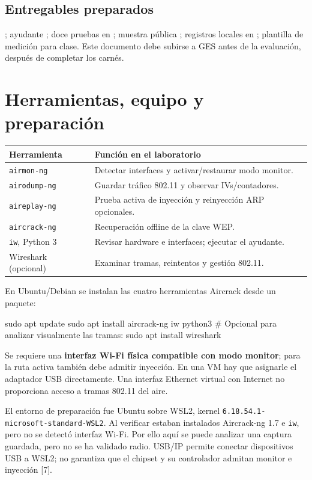 \documentclass[11pt,a4paper]{article}
\begin{document}
\subsection*{Entregables preparados}
; ayudante ; doce pruebas en
; muestra pública ; registros
locales en ; plantilla de medición para clase. Este documento
debe subirse a GES antes de la evaluación, después de completar los carnés.

\newpage
\section{Herramientas, equipo y preparación}
\begin{tabularx}{\linewidth}{|l|X|}\hline
Herramienta & Función en el laboratorio \\\hline
\texttt{airmon-ng} & Detectar interfaces y activar/restaurar modo monitor. \\\hline
\texttt{airodump-ng} & Guardar tráfico 802.11 y observar IVs/contadores. \\\hline
\texttt{aireplay-ng} & Prueba activa de inyección y reinyección ARP opcionales. \\\hline
\texttt{aircrack-ng} & Recuperación offline de la clave WEP. \\\hline
\texttt{iw}, Python 3 & Revisar hardware e interfaces; ejecutar el ayudante. \\\hline
Wireshark (opcional) & Examinar tramas, reintentos y gestión 802.11. \\\hline
\end{tabularx}

En Ubuntu/Debian se instalan las cuatro herramientas Aircrack desde un paquete:
\begin{comandos}
sudo apt update
sudo apt install aircrack-ng iw python3
# Opcional para analizar visualmente las tramas:
sudo apt install wireshark
\end{comandos}

Se requiere una \textbf{interfaz Wi-Fi física compatible con modo monitor};
para la ruta activa también debe admitir inyección. En una VM hay que asignarle
el adaptador USB directamente. Una interfaz Ethernet virtual con Internet no
proporciona acceso a tramas 802.11 del aire.

El entorno de preparación fue Ubuntu sobre WSL2, kernel
\texttt{6.18.54.1-microsoft-standard-WSL2}. Al verificar estaban instalados
Aircrack-ng 1.7 e \texttt{iw}, pero no se detectó interfaz Wi-Fi. Por ello aquí
se puede analizar una captura guardada, pero no se ha validado radio.
USB/IP permite conectar dispositivos USB a WSL2; no garantiza que el chipset y
su controlador admitan monitor e inyección [7].
\end{document}
